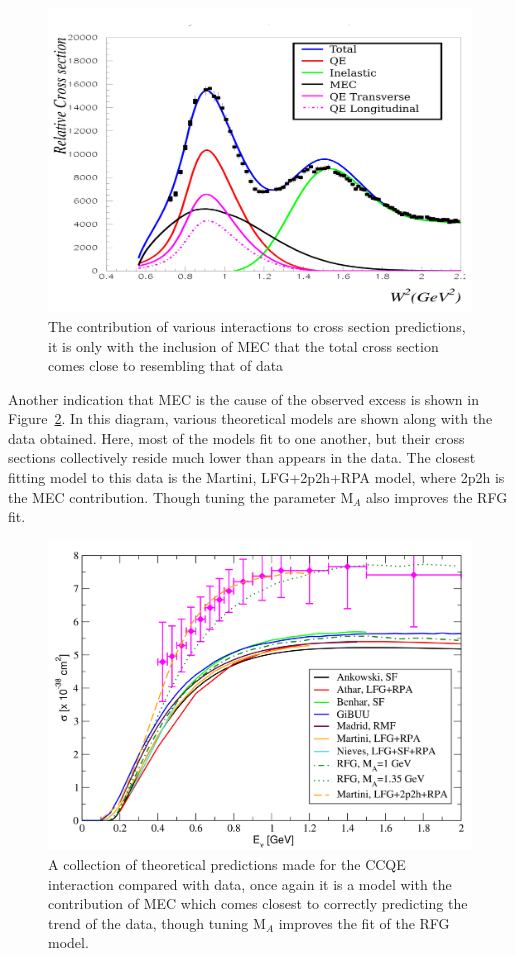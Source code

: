     \begin{figure}[h!]
        \centering
        \includegraphics[width=.8\textwidth]{images/dip_region_3.png}
        \caption{The contribution of various interactions to cross section predictions, it is only with the inclusion of MEC that the total cross section comes close to resembling that of data}
        \label{fig:dipReg}
    \end{figure}

    Another indication that MEC is the cause of the observed excess is shown in Figure~\ref{fig:CCQEXsec}. In this diagram, various theoretical models are shown along with the data obtained. Here, most of the models fit to one another, but their cross sections collectively reside much lower than appears in the data. The closest fitting model to this data is the Martini, LFG+2p2h+RPA model, where 2p2h is the MEC contribution. Though tuning the parameter M\(_{A}\) also improves the RFG fit.  

    \begin{figure}[h!]
        \centering
        \includegraphics[width=.8\textwidth]{images/CCQE_xsec_2.png}
        \caption{A collection of theoretical predictions made for the CCQE interaction compared with data, once again it is a model with the contribution of MEC which comes closest to correctly predicting the trend of the data, though tuning M\(_{A}\) improves the fit of the RFG model.}
        \label{fig:CCQEXsec}
    \end{figure}

